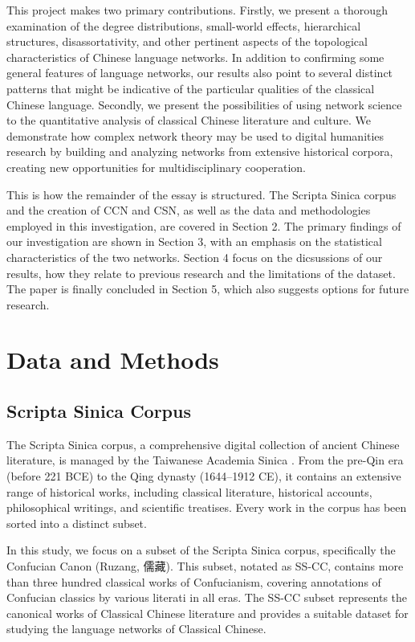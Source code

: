 \documentclass[11pt]{article}
\begin{document}
This project makes two primary contributions. Firstly, we present a thorough examination of the degree distributions, small-world effects, hierarchical structures, disassortativity, and other pertinent aspects of the topological characteristics of Chinese language networks. In addition to confirming some general features of language networks, our results also point to several distinct patterns that might be indicative of the particular qualities of the classical Chinese language. Secondly, we present the possibilities of using network science to the quantitative analysis of classical Chinese literature and culture. We demonstrate how complex network theory may be used to digital humanities research by building and analyzing networks from extensive historical corpora, creating new opportunities for multidisciplinary cooperation.

This is how the remainder of the essay is structured. The Scripta Sinica corpus and the creation of CCN and CSN, as well as the data and methodologies employed in this investigation, are covered in Section 2. The primary findings of our investigation are shown in Section 3, with an emphasis on the statistical characteristics of the two networks. Section 4 focus on the dicsussions of our results, how they relate to previous research and the limitations of the dataset. The paper is finally concluded in Section 5, which also suggests options for future research.

\section{Data and Methods}

\subsection{Scripta Sinica Corpus}
The Scripta Sinica corpus, a comprehensive digital collection of ancient Chinese literature, is managed by the Taiwanese Academia Sinica \cite{ScriptaSinica}. From the pre-Qin era (before 221 BCE) to the Qing dynasty (1644–1912 CE), it contains an extensive range of historical works, including classical literature, historical accounts, philosophical writings, and scientific treatises. Every work in the corpus has been sorted into a distinct subset.

In this study, we focus on a subset of the Scripta Sinica corpus,  specifically the Confucian Canon (Ruzang, 儒藏). This subset, notated as SS-CC, contains more than three hundred classical works of Confucianism, covering annotations of Confucian classics by various literati in all eras. The SS-CC subset represents the canonical works of Classical Chinese literature and provides a suitable dataset for studying the language networks of Classical Chinese.
\end{document}
